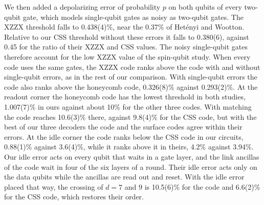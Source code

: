 We then added a depolarizing error of probability $p$ on both qubits of every two-qubit gate, which models single-qubit gates as noisy as two-qubit gates. The XZZX threshold falls to 0.438(4)\%, near the 0.37\% of Het\'enyi and Wootton. Relative to our CSS threshold without these errors it falls to 0.380(6), against 0.45 for the ratio of their XZZX and CSS values. The noisy single-qubit gates therefore account for the low XZZX value of the spin-qubit study. When every code uses the same gates, the XZZX code ranks above the \XYZ{} code with and without single-qubit errors, as in the rest of our comparison. With single-qubit errors the \XYZ{} code also ranks above the honeycomb code, 0.326(8)\% against 0.293(2)\%. At the readout corner the honeycomb code has the lowest threshold in both studies, 1.007(7)\% in ours against about 10\% for the other three codes. With matching the \XYZ{} code reaches 10.6(3)\% there, against 9.8(4)\% for the CSS code, but with the best of our three decoders the \XYZ{} code and the surface codes agree within their errors. At the idle corner the \XYZ{} code ranks below the CSS code in our circuits, 0.88(1)\% against 3.6(4)\%, while it ranks above it in theirs, 4.2\% against 3.94\%. Our idle error acts on every qubit that waits in a gate layer, and the link ancillas of the \XYZ{} code wait in four of the six layers of a round. Their idle error acts only on the data qubits while the ancillas are read out and reset. With the idle error placed that way, the crossing of $d=7$ and $9$ is 10.5(6)\% for the \XYZ{} code and 6.6(2)\% for the CSS code, which restores their order.

